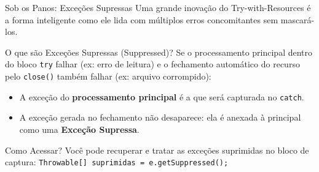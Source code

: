 \documentclass[9pt]{beamer}
\begin{document}
\begin{frame}[fragile]{Sob os Panos: Exceções Supressas}
    Uma grande inovação do Try-with-Resources é a forma inteligente como ele lida com múltiplos erros concomitantes sem mascará-los.
    
    \vspace{0.2cm}
    
    \begin{block}{O que são Exceções Supressas (Suppressed)?}
        Se o processamento principal dentro do bloco \texttt{try} falhar (ex: erro de leitura) e o fechamento automático do recurso pelo \texttt{close()} também falhar (ex: arquivo corrompido):
        \begin{itemize}
            \item A exceção do \textbf{processamento principal} é a que será capturada no \texttt{catch}.
            \item A exceção gerada no fechamento não desaparece: ela é anexada à principal como uma \textbf{Exceção Supressa}.
        \end{itemize}
    \end{block}
    
    \begin{block}{Como Acessar?}
        Você pode recuperar e tratar as exceções suprimidas no bloco de captura:
        \centering\scriptsize
        \texttt{Throwable[] suprimidas = e.getSuppressed();}
    \end{block}
\end{frame}
\end{document}
